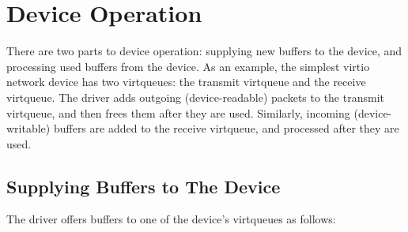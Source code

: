 \section{Device Operation}\label{sec:General Initialization And Device Operation / Device Operation}

There are two parts to device operation: supplying new buffers to
the device, and processing used buffers from the device. As an
example, the simplest virtio network device has two virtqueues: the
transmit virtqueue and the receive virtqueue. The driver adds
outgoing (device-readable) packets to the transmit virtqueue, and then
frees them after they are used. Similarly, incoming (device-writable)
buffers are added to the receive virtqueue, and processed after
they are used.

\subsection{Supplying Buffers to The Device}\label{sec:General Initialization And Device Operation / Device Operation / Supplying Buffers to The Device}

The driver offers buffers to one of the device's virtqueues as follows:

